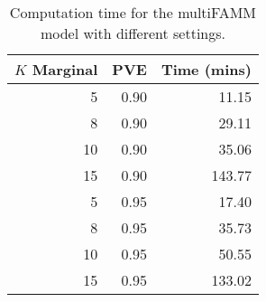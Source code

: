 \begin{table}[ht]
\centering
\begin{tabular}{rrr}
  \toprule
{\bfseries $K$ Marginal} & {\bfseries PVE} & {\bfseries Time (mins)} \\ 
  \midrule
5 & 0.90 & 11.15 \\ 
  8 & 0.90 & 29.11 \\ 
  10 & 0.90 & 35.06 \\ 
  15 & 0.90 & 143.77 \\ 
  5 & 0.95 & 17.40 \\ 
  8 & 0.95 & 35.73 \\ 
  10 & 0.95 & 50.55 \\ 
  15 & 0.95 & 133.02 \\ 
   \bottomrule
\end{tabular}
\caption{Computation time for the multiFAMM model with different settings.} 
\label{tab:mfamm-comp-time}
\end{table}

